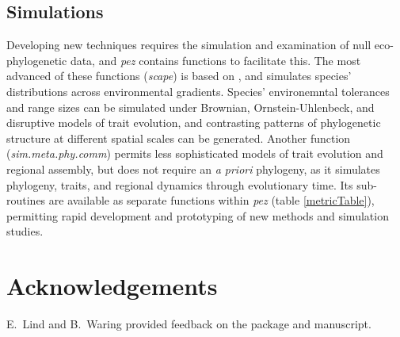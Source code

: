 \documentclass{bioinfo}
\begin{document}
\subsection{Simulations}
Developing new techniques requires the simulation and examination of
null eco-phylogenetic data, and \emph{pez} contains functions to
facilitate this.  The most advanced of these functions (\emph{scape})
is based on \citet{Helmus2012}, and simulates species' distributions
across environmental gradients. Species' environemntal tolerances and
range sizes can be simulated under Brownian, Ornstein-Uhlenbeck, and
disruptive models of trait evolution, and contrasting patterns of
phylogenetic structure at different spatial scales can be
generated. Another function (\emph{sim.meta.phy.comm}) permits less
sophisticated models of trait evolution and regional assembly, but
does not require an \emph{a priori} phylogeny, as it simulates
phylogeny, traits, and regional dynamics through evolutionary
time. Its sub-routines are available as separate functions within
\emph{pez} (table \ref{metricTable}), permitting rapid development and
prototyping of new methods and simulation studies.

\section*{Acknowledgements}
E.\ Lind and B.\ Waring provided feedback on the package and
manuscript.
\end{document}
